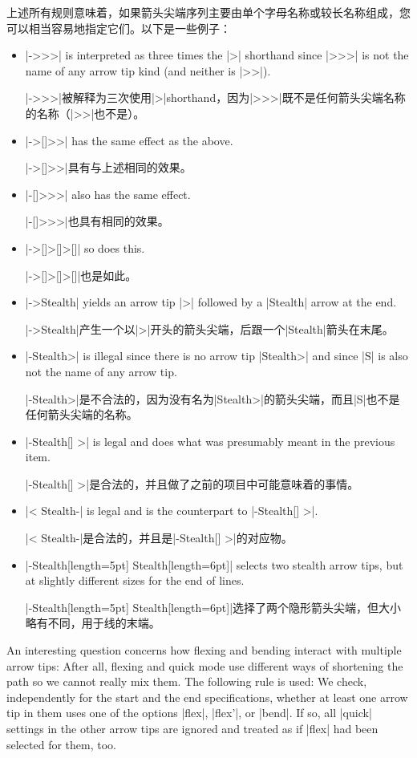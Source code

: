 上述所有规则意味着，如果箭头尖端序列主要由单个字母名称或较长名称组成，您可以相当容易地指定它们。以下是一些例子：
%
\begin{itemize}
    \item |->>>| is interpreted as three times the |>| shorthand since |>>>| is
        not the name of any arrow tip kind (and neither is |>>|).

        |->>>|被解释为三次使用|>|shorthand，因为|>>>|既不是任何箭头尖端名称的名称（|>>|也不是）。
    \item |->[]>>| has the same effect as the above.

    |->[]>>|具有与上述相同的效果。
    \item |-[]>>>| also has the same effect.

    |-[]>>>|也具有相同的效果。
    \item |->[]>[]>[]| so does this.

    |->[]>[]>[]|也是如此。
    \item |->Stealth| yields an arrow tip |>| followed by a |Stealth| arrow
        at the end.

        |->Stealth|产生一个以|>|开头的箭头尖端，后跟一个|Stealth|箭头在末尾。
    \item |-Stealth>| is illegal since there is no arrow tip |Stealth>| and
        since |S| is also not the name of any arrow tip.

        |-Stealth>|是不合法的，因为没有名为|Stealth>|的箭头尖端，而且|S|也不是任何箭头尖端的名称。
    \item |-Stealth[] >| is legal and does what was presumably meant in the
        previous item.

        |-Stealth[] >|是合法的，并且做了之前的项目中可能意味着的事情。
    \item |< Stealth-| is legal and is the counterpart to |-Stealth[] >|.

    |< Stealth-|是合法的，并且是|-Stealth[] >|的对应物。
    \item |-Stealth[length=5pt] Stealth[length=6pt]| selects two stealth
        arrow tips, but at slightly different sizes for the end of lines.

        |-Stealth[length=5pt] Stealth[length=6pt]|选择了两个隐形箭头尖端，但大小略有不同，用于线的末端。
\end{itemize}

An interesting question concerns how flexing and bending interact with multiple
arrow tips: After all, flexing and quick mode use different ways of shortening
the path so we cannot really mix them. The following rule is used: We check,
independently for the start and the end specifications, whether at least one
arrow tip in them uses one of the options |flex|, |flex'|, or |bend|. If so,
all |quick| settings in the other arrow tips are ignored and treated as if
|flex| had been selected for them, too.

